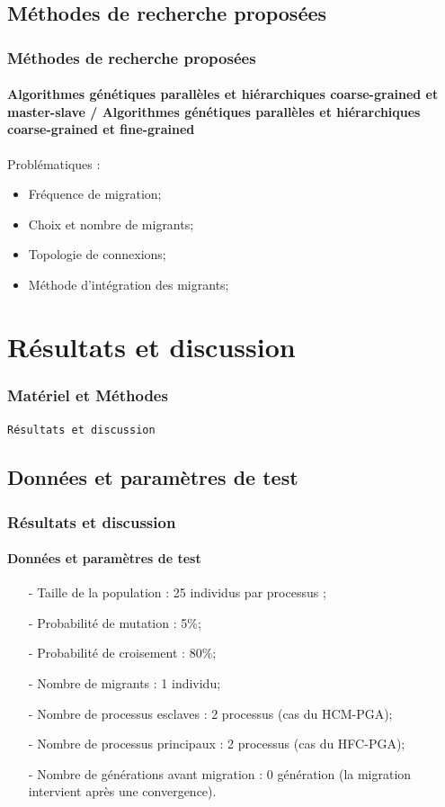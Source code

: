 \documentclass[11pt]{beamer}
\begin{document}
 \subsection{Méthodes de recherche proposées}
 
 \begin{frame}
 \frametitle{Méthodes de recherche proposées}
 \framesubtitle{Algorithmes génétiques parallèles et hiérarchiques coarse-grained et
master-slave / Algorithmes génétiques parallèles et hiérarchiques coarse-grained et
fine-grained}
	
	Problématiques :
	\begin{itemize}
		\item Fréquence de migration;
		\item Choix et nombre de migrants;
		\item Topologie de connexions;
		\item Méthode d’intégration des migrants;
	\end{itemize}
	
 \end{frame} 
 
 \section{Résultats et discussion}
 
 \begin{frame}
 	\frametitle{Matériel et Méthodes}
 	\begin{center}
 		\LARGE{\texttt{Résultats et discussion}}
 	\end{center}
 \end{frame}   
 
 
 \subsection{Données et paramètres de test}
 \begin{frame}
 \frametitle{Résultats et discussion}
 \framesubtitle{Données et paramètres de test}
 \begin{itemize}
					\item[-] Taille de la population : 25 individus par processus ;
			        \item[-] Probabilité de mutation : 5\%;
			        \item[-] Probabilité de croisement : 80\%;
			        \item[-] Nombre de migrants : 1 individu;
		 	        \item[-] Nombre de processus esclaves : 2 processus (cas du HCM-PGA);
			        \item[-] Nombre de processus principaux : 2 processus (cas du HFC-PGA);
			        \item[-] Nombre de générations avant migration : 0 génération (la migration intervient après une convergence).
				\end{itemize}
 \end{frame}
 
\end{document}
